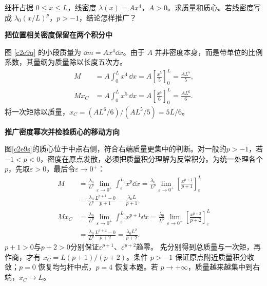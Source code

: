 \begin{question}
\begin{example}[非均匀细杆]
细杆占据 $0\le x\le L$，线密度 $\lambda(x)=Ax^4$，$A>0$。求质量和质心。若线密度写成 $\lambda_0(x/L)^p$，$p>-1$，结论怎样推广？
\end{example}
\end{question}
\begin{solution}\textbf{把位置相关密度保留在两个积分中}\par\nobreak
图 \ref{c2e9q} 的小段质量为 $\dd m=Ax^4\dd x$。由于 $A$ 并非密度本身，而是带单位的比例系数，其量纲为质量除以长度五次方。
\begin{align*}
M&=A\int_0^Lx^4\,\dd x
=A\left[\frac{x^5}{5}\right]_0^L=\frac{AL^5}5,\\
Mx_C&=A\int_0^Lx^5\,\dd x
=A\left[\frac{x^6}{6}\right]_0^L=\frac{AL^6}{6}.
\end{align*}
将一次矩除以质量，$x_C=(AL^6/6)/(AL^5/5)=\boxed{5L/6}$。



\par\medskip{}\noindent\textbf{推广密度幂次并检验质心的移动方向}\par\nobreak
图\ref{c2e9s}的质心位于中点右侧，符合右端质量更集中的判断。对一般的$p>-1$，若$-1<p<0$，密度在原点发散，必须把质量积分理解为反常积分。为统一处理各个$p$，先取$\varepsilon>0$，最后令$\varepsilon\to0^+$：
\begin{align*}
M&=\frac{\lambda_0}{L^p}\lim_{\varepsilon\to0^+}
   \int_\varepsilon^L x^p\dd x
=\frac{\lambda_0}{L^p}\lim_{\varepsilon\to0^+}
   \left[\frac{x^{p+1}}{p+1}\right]_\varepsilon^L\\
&=\frac{\lambda_0}{L^p}
   \frac{L^{p+1}-0}{p+1}=\frac{\lambda_0L}{p+1},\\
Mx_C&=\frac{\lambda_0}{L^p}\lim_{\varepsilon\to0^+}
   \int_\varepsilon^L x^{p+1}\dd x
=\frac{\lambda_0}{L^p}\lim_{\varepsilon\to0^+}
   \left[\frac{x^{p+2}}{p+2}\right]_\varepsilon^L\\
&=\frac{\lambda_0}{L^p}
   \frac{L^{p+2}-0}{p+2}=\frac{\lambda_0L^2}{p+2}.
\end{align*}
$p+1>0$与$p+2>0$分别保证$\varepsilon^{p+1}$、$\varepsilon^{p+2}$趋零。
先分别得到总质量与一次矩，再作商，才有 $x_C=L(p+1)/(p+2)$。条件 $p>-1$ 保证原点附近质量积分收敛；$p=0$ 恢复均匀杆中点，$p=4$ 恢复本题。若 $p\to+\infty$，质量越来越集中到右端，$x_C\to L$。


\end{solution}
